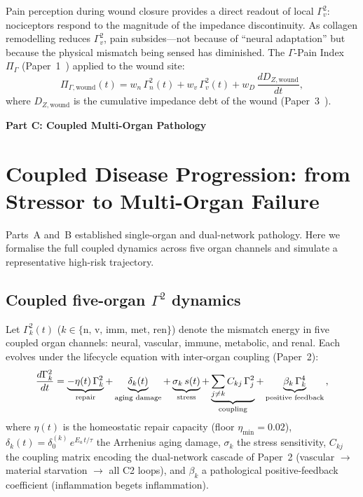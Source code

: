 \documentclass[aps,pre,twocolumn,superscriptaddress,floatfix]{revtex4-2}
\begin{document}
Pain perception during wound closure provides a direct
readout of local $\Gamma_v^2$: nociceptors respond to
the magnitude of the impedance discontinuity.
As collagen remodelling reduces $\Gamma_v^2$, pain
subsides---not because of ``neural adaptation'' but
because the physical mismatch being sensed has
diminished.
The $\Gamma$-Pain Index $\Pi_\Gamma$
(Paper~1~\cite{Paper1}) applied to the wound site:
\begin{equation}
  \Pi_{\Gamma,\text{wound}}(t) =
    w_n\,\Gamma_n^2(t) + w_v\,\Gamma_v^2(t)
    + w_D\,\frac{dD_{Z,\text{wound}}}{dt},
  \label{eq:wound-pain}
\end{equation}
where $D_{Z,\text{wound}}$ is the cumulative
impedance debt of the wound (Paper~3~\cite{Paper3}).


\bigskip\noindent\textbf{\large Part C: Coupled Multi-Organ Pathology}
\label{part:C}
\bigskip


\section{Coupled Disease Progression:
  from Stressor to Multi-Organ Failure}
\label{sec:disease-progression}

Parts~A and~B established single-organ and
dual-network pathology.
Here we formalise the full coupled dynamics across
five organ channels and simulate a representative
high-risk trajectory.


\subsection{Coupled five-organ $\Gamma^2$ dynamics}
\label{sec:coupled-dynamics}

Let $\Gamma_k^2(t)$
($k \in \{\text{n, v, imm, met, ren}\}$)
denote the mismatch energy in five coupled organ
channels: neural, vascular, immune, metabolic, and
renal.
Each evolves under the lifecycle equation with
inter-organ coupling (Paper~2):
\begin{equation}
  \frac{d\Gamma_k^2}{dt}
  = \underbrace{-\eta(t)\,\Gamma_k^2}_{\text{repair}}
  + \underbrace{\delta_k(t)\vphantom{\Gamma_k^2}}_{%
    \text{aging damage}}
  + \underbrace{\sigma_k\,s(t)}_{\text{stress}}
  + \underbrace{\sum_{j \neq k}
    C_{kj}\,\Gamma_j^2}_{\text{coupling}}
  + \underbrace{\beta_k\,\Gamma_k^4}_{%
    \text{positive feedback}}\,,
  \label{eq:coupled-G2}
\end{equation}
where $\eta(t)$ is the homeostatic repair capacity
(floor $\eta_{\min} = 0.02$),
$\delta_k(t) = \delta_0^{(k)}\,e^{E_a\,t/\tau}$ the
Arrhenius aging damage,
$\sigma_k$ the stress sensitivity,
$C_{kj}$ the coupling matrix encoding the
dual-network cascade of Paper~2
(vascular $\to$ material starvation $\to$ all C2
loops), and $\beta_k$ a pathological
positive-feedback coefficient (inflammation begets
inflammation).
\end{document}
